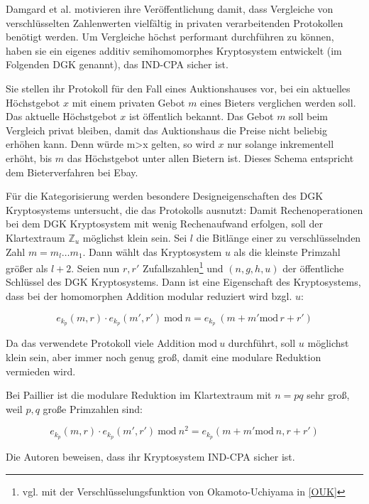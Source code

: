 Damgard et al. motivieren ihre Veröffentlichung damit, dass Vergleiche von verschlüsselten Zahlenwerten vielfältig in privaten verarbeitenden Protokollen benötigt werden. Um Vergleiche höchst performant durchführen zu können, haben sie ein eigenes additiv semihomomorphes Kryptosystem entwickelt (im Folgenden DGK genannt), das IND-CPA sicher ist.

Sie stellen ihr Protokoll für den Fall eines Auktionshauses vor, bei ein aktuelles Höchstgebot $x$ mit einem privaten Gebot $m$ eines Bieters verglichen werden soll. Das aktuelle Höchstgebot $x$ ist öffentlich bekannt. Das Gebot $m$ soll beim Vergleich privat bleiben, damit das Auktionshaus die Preise nicht beliebig erhöhen kann. Denn würde m>x gelten, so wird $x$ nur solange inkrementell erhöht, bis $m$ das Höchstgebot unter allen Bietern ist. Dieses Schema entspricht dem Bieterverfahren bei Ebay.

Für die Kategorisierung werden besondere Designeigenschaften des DGK Kryptosystems untersucht, die das Protokolls ausnutzt: Damit Rechenoperationen bei dem DGK Kryptosystem mit wenig Rechenaufwand erfolgen, soll der Klartextraum $\mathbb{Z}_u$ möglichst klein sein. Sei $l$ die Bitlänge einer zu verschlüsselnden Zahl $m=m_l\ldots m_1$. Dann wählt das Kryptosystem $u$ als die kleinste Primzahl größer als $l+2$. Seien nun $r,r'$ Zufallszahlen\footnote{vgl. mit der Verschlüsselungsfunktion von Okamoto-Uchiyama in \ref{OUK}} und $(n,g,h,u)$ der öffentliche Schlüssel des DGK Kryptosystems. Dann ist eine Eigenschaft des Kryptosystems, dass bei der homomorphen Addition modular reduziert wird bzgl. $u$:

\begin{equation*}
	e_{k_p}(m,r)\cdot e_{k_p}(m',r')\ \text{mod}\ n = e_{k_p}\ (m+m' \text{mod}\,r+r')
\end{equation*}

Da das verwendete Protokoll viele Addition $\text{mod}\ u$ durchführt, soll $u$ möglichst klein sein, aber immer noch genug groß, damit eine modulare Reduktion vermieden wird.

Bei Paillier ist die modulare Reduktion im Klartextraum mit $n=pq$ sehr groß, weil $p,q$ große Primzahlen sind:

\begin{equation*}
	e_{k_p}(m,r)\cdot e_{k_p}(m',r')\ \text{mod}\ n^2 = e_{k_p}(m+m' \text{mod}\ n,r+r')
\end{equation*}

Die Autoren beweisen, dass ihr Kryptosystem IND-CPA sicher ist.

